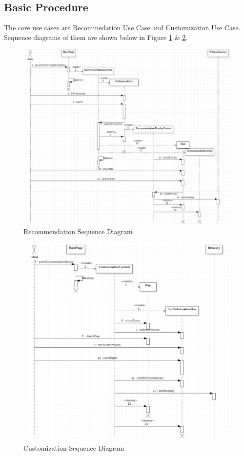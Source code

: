 \documentclass[10pt]{article}
\begin{document}
\subsection{Basic Procedure}
The core use cases are Recommedation Use Case and Customization Use Case. Sequence diagrams of them are shown below in Figure \ref{Recommendation Sequence Diagram} \& \ref{Customization Sequence Diagram}.

\begin{figure}[H]
	\centering
	\includegraphics[width=14cm]{recommendation.png}
	\caption{Recommendation Sequence Diagram}
	\label{Recommendation Sequence Diagram}
\end{figure}
	
\begin{figure}[H]
	\centering
	\includegraphics[width=14cm]{customization.png}
	\caption{Customization Sequence Diagram}
	\label{Customization Sequence Diagram}
\end{figure}
\end{document}

